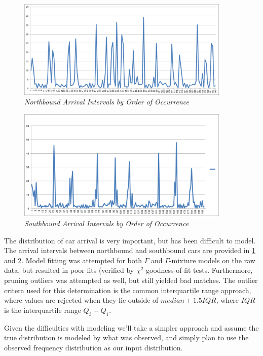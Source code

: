 \documentclass[a4paper,12pt]{article}
\begin{document}
\begin{figure}
\begin{center}  
\includegraphics[width=4in]{../northbound.png}  
\caption{\small \sl Northbound Arrival Intervals by Order of Occurrence\label{fig:northbound_arrival}}  
\end{center}  
\end{figure} 

\begin{figure}  
\begin{center}
\includegraphics[width=4in]{../southbound.png}
\caption{\small \sl Southbound Arrival Intervals by Order of Occurrence\label{fig:southbound_arrival}}  
\end{center}  
\end{figure} 

The distribution of car arrival is very important, but has been difficult to model. The arrival intervals between 
northbound and southbound cars are provided in \ref{fig:northbound_arrival} and \ref{fig:southbound_arrival}.
Model fitting was attempted for both $\Gamma$ and $\Gamma$-mixture models on the raw data, but resulted in poor
fits (verified by $\chi^2$ goodness-of-fit tests. Furthermore, pruning outliers was attempted as well, but still
yielded bad matches. The outlier critera used for
this determination is the common interquartile range approach, where values are rejected when
they lie outside of $median + 1.5IQR$, where $IQR$ is the interquartile range $Q_3 - Q_1$.

Given the difficulties with modeling we'll take a simpler approach and assume the true distribution is modeled by what was observed,
and simply plan to use the observed frequency distribution as our input distribution.
\end{document}
